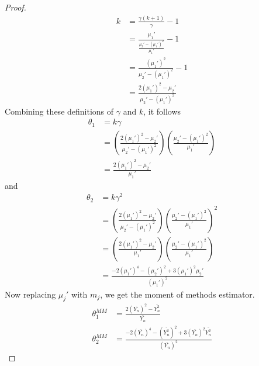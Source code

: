 \documentclass[letterpaper, 12pt]{article}\usepackage[]{graphicx}\usepackage[]{color}
\begin{document}
\begin{proof}
\begin{align*}
k 
&= 
\frac{\gamma(k+1)}{\gamma} - 1
\\
&=
\frac{\mu_1'}{\frac{
\mu_2' - (\mu_1')^2
}{\mu_1'}}
-
1
\\
&=
\frac{(\mu_1')^2}{\mu_2' - (\mu_1')^2}
-
1
\\
&=
\frac{2(\mu_1')^2 - \mu_2'}{\mu_2' - (\mu_1')^2}
\end{align*}
Combining these definitions of $\gamma$ and $k$, it follows
\begin{align*}
\theta_1 
&= 
k\gamma
\\
&=
\left(
\frac{2(\mu_1')^2 - \mu_2'}{\mu_2' - (\mu_1')^2}
\right)
\left(
\frac{
\mu_2' - (\mu_1')^2
}{\mu_1'}
\right)
\\
&=
\frac{2(\mu_1')^2 - \mu_2'}{\mu_1'}
\end{align*}
and
\begin{align*}
\theta_2
&=
k\gamma^2
\\
&=
\left(
\frac{2(\mu_1')^2 - \mu_2'}{\mu_2' - (\mu_1')^2}
\right)
\left(
\frac{
\mu_2' - (\mu_1')^2
}{\mu_1'}
\right)^2
\\
&=
\left(
\frac{2(\mu_1')^2 - \mu_2'}{\mu_1'}
\right)
\left(
\frac{
\mu_2' - (\mu_1')^2
}{\mu_1'}
\right)
\\
&=
\frac{-2(\mu_1')^4 - (\mu_2')^2 + 3(\mu_1')^2\mu_2'}
{(\mu_1')^2}
\end{align*}
Now replacing $\mu_j'$ with $m_j$, we get the moment of methods estimator.
\begin{align*}
\theta_1^{MM} &=
\frac{2(\overline{Y_n})^2 - \overline{Y_n^2}}{\overline{Y_n}}
\\
\theta_2^{MM} &= 
\frac{-2 (\overline{Y_n})^4 - (\overline{Y_n^2})^2 + 3(\overline{Y_n})^2 \overline{Y_n^2}}{(\overline{Y_n})^2}
\end{align*}

\end{proof}
\end{document}
